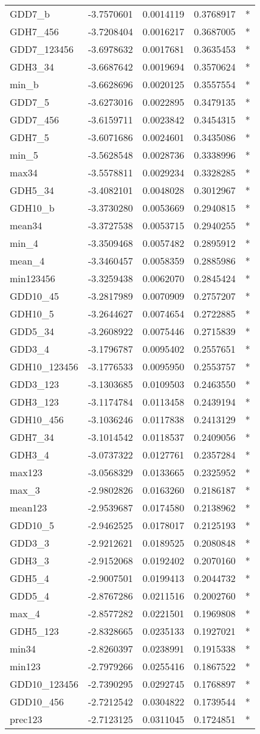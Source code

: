 \documentclass[10pt,]{article}
\begin{document}
\begin{longtable}[]{@{}lrrrl@{}}
GDD7\_b & -3.7570601 & 0.0014119 & 0.3768917 & *\tabularnewline
GDH7\_456 & -3.7208404 & 0.0016217 & 0.3687005 & *\tabularnewline
GDD7\_123456 & -3.6978632 & 0.0017681 & 0.3635453 & *\tabularnewline
GDH3\_34 & -3.6687642 & 0.0019694 & 0.3570624 & *\tabularnewline
min\_b & -3.6628696 & 0.0020125 & 0.3557554 & *\tabularnewline
GDD7\_5 & -3.6273016 & 0.0022895 & 0.3479135 & *\tabularnewline
GDD7\_456 & -3.6159711 & 0.0023842 & 0.3454315 & *\tabularnewline
GDH7\_5 & -3.6071686 & 0.0024601 & 0.3435086 & *\tabularnewline
min\_5 & -3.5628548 & 0.0028736 & 0.3338996 & *\tabularnewline
max34 & -3.5578811 & 0.0029234 & 0.3328285 & *\tabularnewline
GDH5\_34 & -3.4082101 & 0.0048028 & 0.3012967 & *\tabularnewline
GDH10\_b & -3.3730280 & 0.0053669 & 0.2940815 & *\tabularnewline
mean34 & -3.3727538 & 0.0053715 & 0.2940255 & *\tabularnewline
min\_4 & -3.3509468 & 0.0057482 & 0.2895912 & *\tabularnewline
mean\_4 & -3.3460457 & 0.0058359 & 0.2885986 & *\tabularnewline
min123456 & -3.3259438 & 0.0062070 & 0.2845424 & *\tabularnewline
GDD10\_45 & -3.2817989 & 0.0070909 & 0.2757207 & *\tabularnewline
GDH10\_5 & -3.2644627 & 0.0074654 & 0.2722885 & *\tabularnewline
GDD5\_34 & -3.2608922 & 0.0075446 & 0.2715839 & *\tabularnewline
GDD3\_4 & -3.1796787 & 0.0095402 & 0.2557651 & *\tabularnewline
GDH10\_123456 & -3.1776533 & 0.0095950 & 0.2553757 & *\tabularnewline
GDD3\_123 & -3.1303685 & 0.0109503 & 0.2463550 & *\tabularnewline
GDH3\_123 & -3.1174784 & 0.0113458 & 0.2439194 & *\tabularnewline
GDH10\_456 & -3.1036246 & 0.0117838 & 0.2413129 & *\tabularnewline
GDH7\_34 & -3.1014542 & 0.0118537 & 0.2409056 & *\tabularnewline
GDH3\_4 & -3.0737322 & 0.0127761 & 0.2357284 & *\tabularnewline
max123 & -3.0568329 & 0.0133665 & 0.2325952 & *\tabularnewline
max\_3 & -2.9802826 & 0.0163260 & 0.2186187 & *\tabularnewline
mean123 & -2.9539687 & 0.0174580 & 0.2138962 & *\tabularnewline
GDD10\_5 & -2.9462525 & 0.0178017 & 0.2125193 & *\tabularnewline
GDD3\_3 & -2.9212621 & 0.0189525 & 0.2080848 & *\tabularnewline
GDH3\_3 & -2.9152068 & 0.0192402 & 0.2070160 & *\tabularnewline
GDH5\_4 & -2.9007501 & 0.0199413 & 0.2044732 & *\tabularnewline
GDD5\_4 & -2.8767286 & 0.0211516 & 0.2002760 & *\tabularnewline
max\_4 & -2.8577282 & 0.0221501 & 0.1969808 & *\tabularnewline
GDH5\_123 & -2.8328665 & 0.0235133 & 0.1927021 & *\tabularnewline
min34 & -2.8260397 & 0.0238991 & 0.1915338 & *\tabularnewline
min123 & -2.7979266 & 0.0255416 & 0.1867522 & *\tabularnewline
GDD10\_123456 & -2.7390295 & 0.0292745 & 0.1768897 & *\tabularnewline
GDD10\_456 & -2.7212542 & 0.0304822 & 0.1739544 & *\tabularnewline
prec123 & -2.7123125 & 0.0311045 & 0.1724851 & *\tabularnewline

\end{longtable}
\end{document}
